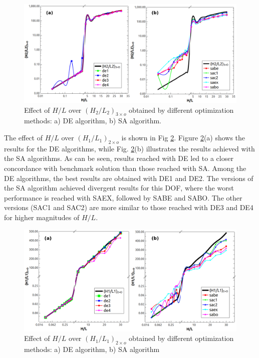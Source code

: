 \documentclass[12pt,fleqn]{article}
\begin{document}
\begin{figure}[H]
\centering
\includegraphics[width=0.95\linewidth]{imgs/5dof/de_sa_hl_h2l2.png}
\caption{ {\small Effect of $H/L$ over ${(H_{2}/L_{2})_{3\times o}}$ obtained by different optimization methods: a) DE algorithm, b) SA algorithm.}}
\label{figure06}
\end{figure}


The effect of $H/L$ over ${(H_{1}/L_{1})_{2\times o}}$ is shown in Fig \ref{figure07}. Figure \ref{figure07}(a) shows the results for the DE algorithms, while Fig. \ref{figure07}(b) illustrates the results achieved with the SA algorithms. As can be seen, results reached with DE led to a closer concordance with benchmark solution than those reached with SA. Among the DE algorithms, the best results are obtained with DE1 and DE2. The versions of the SA algorithm achieved divergent results for this DOF, where the worst performance is reached with SAEX, followed by  SABE and SABO. The other versions (SAC1 and SAC2) are more similar to those reached with DE3 and DE4 for higher magnitudes of $H/L$.


\begin{figure}[H]
\centering
\includegraphics[width=0.95\linewidth]{imgs/5dof/de_sa_hl_h1l1.png}
\caption{ {\small Effect of $H/L$ over ${(H_{1}/L_{1})_{2\times o}}$ obtained by different optimization methods: a) DE algorithm, b) SA algorithm}}
\label{figure07}
\end{figure}
\end{document}
